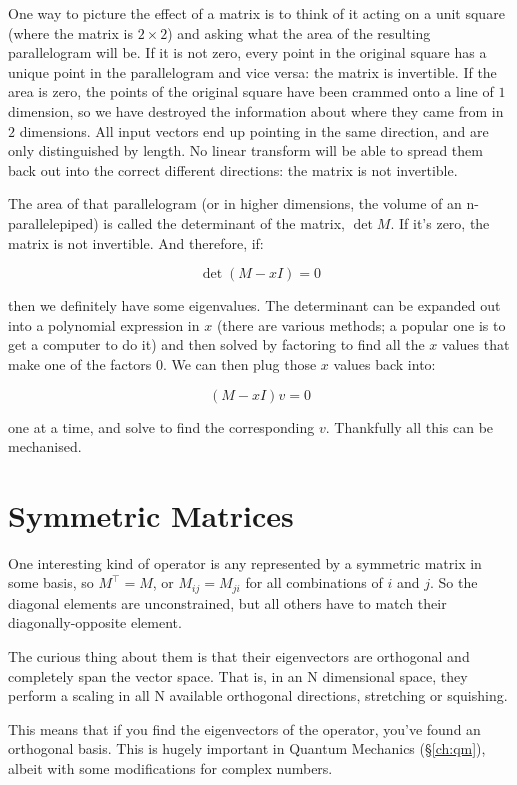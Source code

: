 One way to picture the effect of a matrix is to think of it acting on a unit square (where the matrix is $2 \times 2$) and asking what the area of the resulting parallelogram will be. If it is not zero, every point in the original square has a unique point in the parallelogram and vice versa: the matrix is invertible. If the area is zero, the points of the original square have been crammed onto a line of $1$ dimension, so we have destroyed the information about where they came from in $2$ dimensions. All input vectors end up pointing in the same direction, and are only distinguished by length. No linear transform will be able to spread them back out into the correct different directions: the matrix is not invertible.

The area of that parallelogram (or in higher dimensions, the volume of an n-parallelepiped) is called the determinant of the matrix, $\det M$. If it's zero, the matrix is not invertible. And therefore, if:

$$\det{(M - xI)} = 0$$

then we definitely have some eigenvalues. The determinant can be expanded out into a polynomial expression in $x$ (there are various methods; a popular one is to get a computer to do it) and then solved by factoring to find all the $x$ values that make one of the factors $0$. We can then plug those $x$ values back into:

$$(M - xI)v = 0$$

one at a time, and solve to find the corresponding $v$. Thankfully all this can be mechanised.

\section{Symmetric Matrices}\label{ch:vectors-symmetric}

One interesting kind of operator is any represented by a symmetric matrix in some basis, so $M^\intercal = M$, or $M_{ij} = M_{ji}$ for all combinations of $i$ and $j$. So the diagonal elements are unconstrained, but all others have to match their diagonally-opposite element.

The curious thing about them is that their eigenvectors are orthogonal and completely span the vector space. That is, in an N dimensional space, they perform a scaling in all N available orthogonal directions, stretching or squishing.

This means that if you find the eigenvectors of the operator, you've found an orthogonal basis. This is hugely important in Quantum Mechanics (§\ref{ch:qm}), albeit with some modifications for complex numbers.

